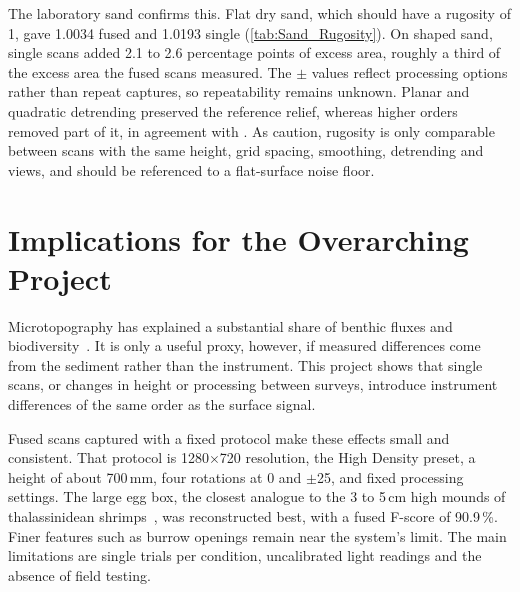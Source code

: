 The laboratory sand confirms this. Flat dry sand, which should have a rugosity of 1, gave 1.0034 fused and 1.0193 single (\autoref{tab:Sand_Rugosity}). On shaped sand, single scans added 2.1 to 2.6 percentage points of excess area, roughly a third of the excess area the fused scans measured. The $\pm$ values reflect processing options rather than repeat captures, so repeatability remains unknown. Planar and quadratic detrending preserved the reference relief, whereas higher orders removed part of it, in agreement with \citet{azharRGBDFrameworkCapturing2022}. As \citet{jacobsQuantitativeCharacterizationSurface2017} caution, rugosity is only comparable between scans with the same height, grid spacing, smoothing, detrending and views, and should be referenced to a flat-surface noise floor.

\section{Implications for the Overarching Project}
\label{ch8:sec:Implications}

Microtopography has explained a substantial share of benthic fluxes and biodiversity~\cite{schenoneSedimentMicrotopographyPredicts2024,schenoneSeafloorSedimentMicrotopography2025}. It is only a useful proxy, however, if measured differences come from the sediment rather than the instrument. This project shows that single scans, or changes in height or processing between surveys, introduce instrument differences of the same order as the surface signal.

Fused scans captured with a fixed protocol make these effects small and consistent. That protocol is 1280$\times$720 resolution, the High Density preset, a height of about 700\,mm, four rotations at 0\textdegree{} and $\pm$25\textdegree, and fixed processing settings. The large egg box, the closest analogue to the 3 to 5\,cm high mounds of thalassinidean shrimps~\cite{inbook}, was reconstructed best, with a fused F-score of 90.9\,\%. Finer features such as burrow openings remain near the system's limit. The main limitations are single trials per condition, uncalibrated light readings and the absence of field testing.

